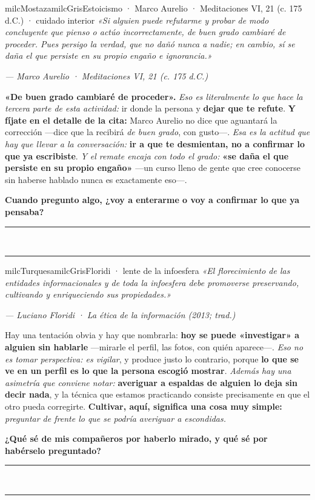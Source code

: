 \documentclass[11pt,letterpaper]{article}
\newcommand{\linead}[1]{\noindent\color{milcLinea}\rule{#1}{0.5pt}\color{milcNegro}}
\begin{document}
\begin{softbox}{milcMostaza}{milcGris}{Estoicismo · Marco Aurelio · Meditaciones VI, 21 (c. 175 d.C.) · cuidado interior}
\textit{«Si alguien puede refutarme y probar de modo concluyente que pienso o actúo incorrectamente, de buen grado cambiaré de proceder. Pues persigo la verdad, que no dañó nunca a nadie; en cambio, sí se daña el que persiste en su propio engaño e ignorancia.»}

{\footnotesize\itshape\color{milcNegro!70}--- Marco Aurelio · Meditaciones VI, 21 (c. 175 d.C.)}

\textbf{«De buen grado cambiaré de proceder».} \emph{Eso es literalmente lo que hace la tercera parte de esta actividad:} ir donde la persona y \textbf{dejar que te refute}. \textbf{Y fíjate en el detalle de la cita:} Marco Aurelio no dice que aguantará la corrección ---dice que la recibirá \emph{de buen grado}, con gusto---. \emph{Esa es la actitud que hay que llevar a la conversación:} \textbf{ir a que te desmientan, no a confirmar lo que ya escribiste}. \emph{Y el remate encaja con todo el grado:} \textbf{«se daña el que persiste en su propio engaño»} ---un curso lleno de gente que cree conocerse sin haberse hablado nunca es exactamente eso---.

\textbf{Cuando pregunto algo, ¿voy a enterarme o voy a confirmar lo que ya pensaba?}
\end{softbox}
\linead{\linewidth}\\[1mm]
\linead{\linewidth}

\begin{softbox}{milcTurquesa}{milcGris}{Floridi · lente de la infoesfera}
\textit{«El florecimiento de las entidades informacionales y de toda la infoesfera debe promoverse preservando, cultivando y enriqueciendo sus propiedades.»}

{\footnotesize\itshape\color{milcNegro!70}--- Luciano Floridi · La ética de la información (2013; trad.)}

Hay una tentación obvia y hay que nombrarla: \textbf{hoy se puede «investigar» a alguien sin hablarle} ---mirarle el perfil, las fotos, con quién aparece---. \emph{Eso no es tomar perspectiva: es vigilar}, y produce justo lo contrario, porque \textbf{lo que se ve en un perfil es lo que la persona escogió mostrar}. \emph{Además hay una asimetría que conviene notar:} \textbf{averiguar a espaldas de alguien lo deja sin decir nada}, y la técnica que estamos practicando consiste precisamente en que el otro pueda corregirte. \textbf{Cultivar, aquí, significa una cosa muy simple:} \emph{preguntar de frente lo que se podría averiguar a escondidas.}

\textbf{¿Qué sé de mis compañeros por haberlo mirado, y qué sé por habérselo preguntado?}
\end{softbox}
\linead{\linewidth}\\[1mm]
\linead{\linewidth}
\end{document}
